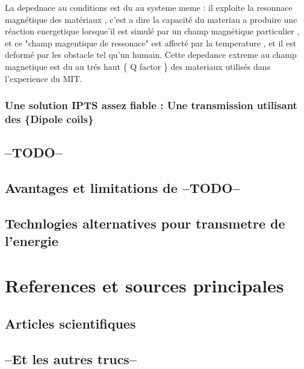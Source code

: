 \documentclass[11pt]{report}
\begin{document}
	La depednace au conditions est du au systeme meme : il exploite la resonnace magnétique des matériaux , c'est a dire la capacité du materiau a produire une réaction energetique lorsque'il est simulé par un champ magnétique particulier , et ce "champ magentique de ressonace" est affecté par la temperature , et il est deformé par les obstacle tel qu'un humain. Cette depedance extreme au champ magnetique est du au trés haut \{ Q factor \} des materiaux utilisés dans l'experience du MIT.
\subsection{Une solution IPTS assez fiable : Une transmission utilisant des \{Dipole coils\}}
\section{--TODO--} %
\section{Avantages et limitations de --TODO--}
\section{Technlogies alternatives pour transmetre de l'energie}

\chapter{References et sources principales}
\section{Articles scientifiques}
\section{--Et les autres trucs--}
\end{document}

